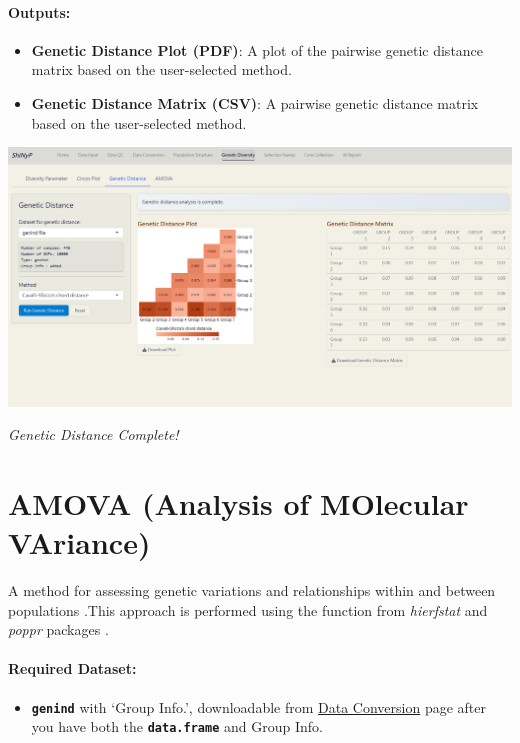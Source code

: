\documentclass[
]{book}
\providecommand{\tightlist}{%
  \setlength{\itemsep}{0pt}\setlength{\parskip}{0pt}}
\begin{document}
\paragraph*{Outputs:}\label{outputs-14}

\begin{itemize}
\item
  \textbf{Genetic Distance Plot (PDF)}: A plot of the pairwise genetic distance matrix based on the user-selected method.
\item
  \textbf{Genetic Distance Matrix (CSV)}: A pairwise genetic distance matrix based on the user-selected method.
\end{itemize}

\includegraphics{images/clipboard-124406020.png}

\emph{Genetic Distance Complete!}

\section{AMOVA (Analysis of MOlecular VAriance)}\label{amova-analysis-of-molecular-variance}

A method for assessing genetic variations and relationships within and between populations \citep{excoffier1992}.This approach is performed using the function from \emph{hierfstat} and \emph{poppr} packages \citep{kamvar2014, goudet2004}.

\paragraph*{Required Dataset:}\label{required-dataset-7}

\begin{itemize}
\tightlist
\item
  {\textbf{\texttt{genind}}} with `Group Info.', downloadable from \ul{Data Conversion} page after you have both the {\textbf{\texttt{data.frame}}} and Group Info.
\end{itemize}
\end{document}
